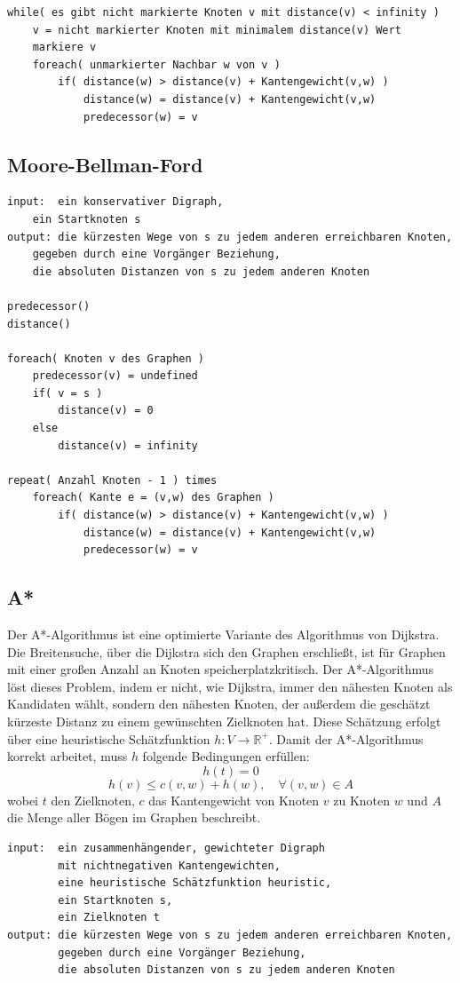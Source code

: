 \documentclass[10pt,a4paper,landscape]{article}
\begin{document}
\begin{multicols*}{2}
\begin{verbatim}
while( es gibt nicht markierte Knoten v mit distance(v) < infinity )
    v = nicht markierter Knoten mit minimalem distance(v) Wert
    markiere v
    foreach( unmarkierter Nachbar w von v )
        if( distance(w) > distance(v) + Kantengewicht(v,w) )
            distance(w) = distance(v) + Kantengewicht(v,w)
            predecessor(w) = v
    \end{verbatim}
\normalsize

    \subsection{ Moore-Bellman-Ford }
    \small
\begin{verbatim}
input:  ein konservativer Digraph,
    ein Startknoten s
output: die kürzesten Wege von s zu jedem anderen erreichbaren Knoten, 
    gegeben durch eine Vorgänger Beziehung,
    die absoluten Distanzen von s zu jedem anderen Knoten
    
predecessor()
distance()

foreach( Knoten v des Graphen )
    predecessor(v) = undefined
    if( v = s )
        distance(v) = 0
    else
        distance(v) = infinity

repeat( Anzahl Knoten - 1 ) times
    foreach( Kante e = (v,w) des Graphen )
        if( distance(w) > distance(v) + Kantengewicht(v,w) )
            distance(w) = distance(v) + Kantengewicht(v,w)
            predecessor(w) = v
    \end{verbatim}
\normalsize

    \subsection{ A* }
    Der A*-Algorithmus ist eine optimierte Variante des Algorithmus von Dijkstra. Die Breitensuche, über die Dijkstra sich den 
    Graphen erschließt, ist für Graphen mit einer großen Anzahl an Knoten speicherplatzkritisch. Der A*-Algorithmus löst dieses 
    Problem, indem er nicht, wie Dijkstra, immer den nähesten Knoten als Kandidaten wählt, sondern den nähesten Knoten, der außerdem 
    die geschätzt kürzeste Distanz zu einem gewünschten Zielknoten hat. Diese Schätzung erfolgt über eine heuristische 
    Schätzfunktion $h: V \rightarrow \mathbb{R}^+$.
    \newline
    Damit der A*-Algorithmus korrekt arbeitet, muss $h$ folgende Bedingungen erfüllen:
    \[ h(t) = 0 \]
    \[ h(v) \leq c(v,w) + h(w), \quad \forall (v,w) \in A \]
    wobei $t$ den Zielknoten, $c$ das Kantengewicht von Knoten $v$ zu Knoten $w$ und $A$ die Menge aller Bögen im Graphen beschreibt.
    \small
\begin{verbatim}
input:  ein zusammenhängender, gewichteter Digraph 
        mit nichtnegativen Kantengewichten,
        eine heuristische Schätzfunktion heuristic,
        ein Startknoten s,
        ein Zielknoten t
output: die kürzesten Wege von s zu jedem anderen erreichbaren Knoten, 
        gegeben durch eine Vorgänger Beziehung,
        die absoluten Distanzen von s zu jedem anderen Knoten


\end{verbatim}
\end{multicols*}
\end{document}
